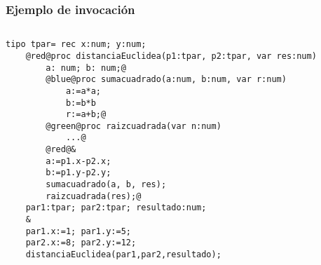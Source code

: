 \documentclass[hyperref={pdfpagelabels=false},tree-dvips,compress]{beamer}
\begin{document}
\begin{frame}[fragile]
\frametitle{Ejemplo de invocación}

\begin{columns}[T]
\begin{lstlisting}[style=codigo]
	tipo tpar= rec x:num; y:num;
	@red@proc distanciaEuclidea(p1:tpar, p2:tpar, var res:num)
	    a: num; b: num;@
	    @blue@proc sumacuadrado(a:num, b:num, var r:num)
            a:=a*a;
	        b:=b*b
	        r:=a+b;@
	    @green@proc raizcuadrada(var n:num)
	        ...@
	    @red@&
	    a:=p1.x-p2.x;
	    b:=p1.y-p2.y;
	    sumacuadrado(a, b, res);
	    raizcuadrada(res);@
	par1:tpar; par2:tpar; resultado:num;
	&
	par1.x:=1; par1.y:=5;
	par2.x:=8; par2.y:=12;
	distanciaEuclidea(par1,par2,resultado);
\end{lstlisting}
\end{columns}

\end{frame}
\end{document}
